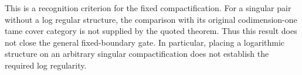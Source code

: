 \begin{remark}
This is a recognition criterion for the fixed compactification.
For a singular pair without a log regular structure, the
comparison with its original codimension-one tame cover category
is not supplied by the quoted theorem.  Thus this result does
not close the general fixed-boundary gate.  In particular,
placing a logarithmic structure on an arbitrary singular
compactification does not establish the required log regularity.
\end{remark}
